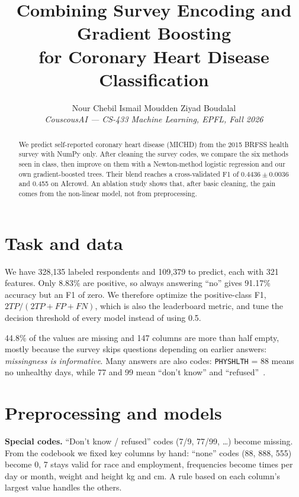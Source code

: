 \documentclass[10pt,conference,compsocconf]{IEEEtran}
\begin{document}
\title{Combining Survey Encoding and Gradient Boosting\\for Coronary Heart Disease Classification}

\author{
  Nour Chebil \qquad Ismail Moudden \qquad Ziyad Boudalal\\
  \textit{CouscousAI --- CS-433 Machine Learning, EPFL, Fall 2026}
}

\maketitle

\begin{abstract}
We predict self-reported coronary heart disease (MICHD) from the 2015 BRFSS health survey with
NumPy only. After cleaning the survey codes, we compare the six methods seen in class, then improve
on them with a Newton-method logistic regression and our own gradient-boosted trees. Their blend
reaches a cross-validated F1 of $0.4436 \pm 0.0036$ and 0.455 on AIcrowd. An ablation study shows
that, after basic cleaning, the gain comes from the non-linear model, not from preprocessing.
\end{abstract}

\section{Task and data}
We have 328{,}135 labeled respondents and 109{,}379 to predict, each with 321 features. Only
8.83\% are positive, so always answering ``no'' gives 91.17\% accuracy but an F1 of zero. We
therefore optimize the positive-class F1, $2TP/(2TP+FP+FN)$, which is also the leaderboard
metric, and tune the decision threshold of every model instead of using 0.5.

44.8\% of the values are missing and 147 columns are more than half empty, mostly because the
survey skips questions depending on earlier answers: \emph{missingness is informative}. Many answers are also codes: \texttt{PHYSHLTH} = 88 means no unhealthy days, while
77 and 99 mean ``don't know'' and ``refused''~\cite{brfss}.

\section{Preprocessing and models}
\textbf{Special codes.} ``Don't know / refused'' codes (7/9, 77/99, \ldots) become missing.
From the codebook we fixed key columns by hand: ``none'' codes (88, 888, 555) become 0, 7 stays
valid for race and employment, frequencies become times per day or month, weight and height kg and
cm. A rule based on each column's largest value handles the others.
\end{document}
